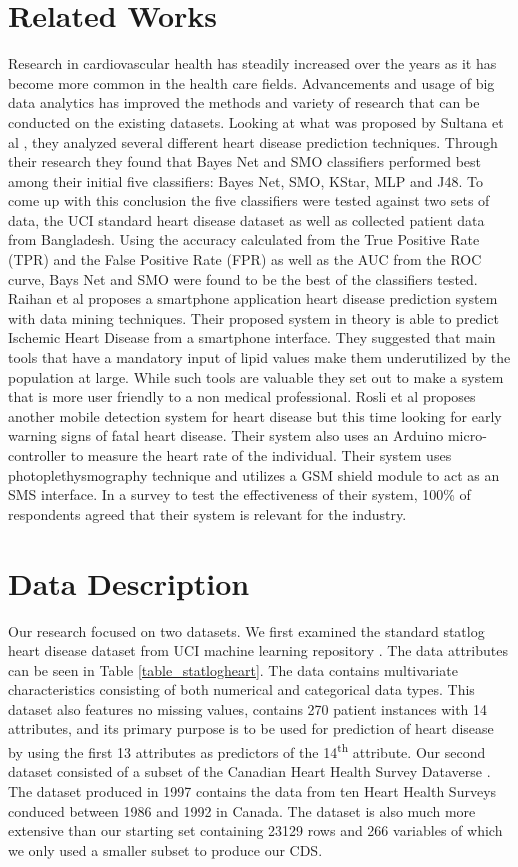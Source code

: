 \documentclass[conference]{IEEEtran}
\begin{document}
\section{Related Works}
Research in cardiovascular health has steadily increased over the years as it has become more common in the health care fields. Advancements and usage of big data analytics has improved the methods and variety of research that can be conducted on the existing datasets. 
Looking at what was proposed by Sultana et al \cite{7873142}, they analyzed several different heart disease prediction techniques. Through their research they found that Bayes Net and SMO classifiers performed best among their initial five classifiers: Bayes Net, SMO, KStar, MLP and J48. To come up with this conclusion the five classifiers were tested against two sets of data, the UCI standard heart disease dataset as well as collected patient data from Bangladesh. Using the accuracy calculated from the True Positive Rate (TPR) and the False Positive Rate (FPR) as well as the AUC from the ROC curve, Bays Net and SMO were found to be the best of the classifiers tested.
   Raihan et al \cite{7860213} proposes a smartphone application heart disease prediction system with data mining techniques. Their proposed system in theory is able to predict Ischemic Heart Disease from a smartphone interface. They suggested that main tools that have a mandatory input of lipid values make them underutilized by the population at large. While such tools are valuable they set out to make a system that is more user friendly to a non medical professional. 
   Rosli et al \cite{7808353} proposes another mobile detection system for heart disease but this time looking for early warning signs of fatal heart disease. Their system also uses an Arduino micro-controller to measure the heart rate of the individual. Their system uses photoplethysmography technique and utilizes a GSM shield module to act as an SMS interface. In a survey to test the effectiveness of their system, 100\% of respondents agreed that their system is relevant for the industry.
\section{Data Description}
Our research focused on two datasets. We first examined the standard statlog heart disease dataset from UCI machine learning repository \cite{StatlogHeart}.  The data attributes can be seen in Table \ref{table_statlogheart}.  The data contains multivariate characteristics consisting of both numerical and categorical data types.
This dataset also features no missing values, contains 270 patient instances with 14 attributes, and its primary purpose is to be used for prediction of heart disease by using the first 13 attributes as predictors of the 14\textsuperscript{th} attribute.
Our second dataset consisted of a subset of the Canadian Heart Health Survey Dataverse \cite{HealthSurvey}. The dataset produced in 1997 contains the data from ten Heart Health Surveys conduced between 1986 and 1992 in Canada. The dataset is also much more extensive than our starting set containing 23129 rows and 266 variables of which we only used a smaller subset to produce our CDS.
\end{document}
